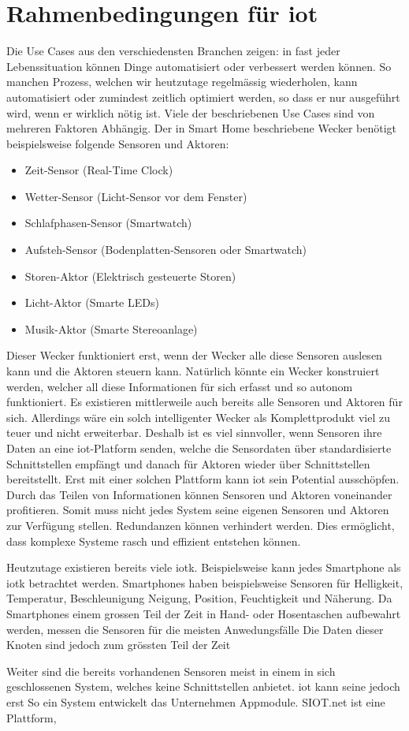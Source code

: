 \chapter{Rahmenbedingungen für \gls{iot}}
Die Use Cases aus den verschiedensten Branchen zeigen: in fast jeder Lebenssituation können Dinge automatisiert oder verbessert werden können. So manchen Prozess, welchen wir heutzutage regelmässig wiederholen, kann automatisiert oder zumindest zeitlich optimiert werden, so dass er nur ausgeführt wird, wenn er wirklich nötig ist. Viele der beschriebenen Use Cases sind von mehreren Faktoren Abhängig. Der in Smart Home beschriebene Wecker benötigt beispielsweise folgende Sensoren und Aktoren:
\begin{itemize}  
  \item Zeit-Sensor (Real-Time Clock)
  \item Wetter-Sensor (Licht-Sensor vor dem Fenster)
  \item Schlafphasen-Sensor (Smartwatch)
  \item Aufsteh-Sensor (Bodenplatten-Sensoren oder Smartwatch)
  \item Storen-Aktor (Elektrisch gesteuerte Storen)
  \item Licht-Aktor (Smarte LEDs)
  \item Musik-Aktor (Smarte Stereoanlage)
\end{itemize}
Dieser Wecker funktioniert erst, wenn der Wecker alle diese Sensoren auslesen kann und die Aktoren steuern kann. Natürlich könnte ein Wecker konstruiert werden, welcher all diese Informationen für sich erfasst und so autonom funktioniert. Es existieren mittlerweile auch bereits alle Sensoren und Aktoren für sich. Allerdings wäre ein solch intelligenter Wecker als Komplettprodukt viel zu teuer und nicht erweiterbar. Deshalb ist es viel sinnvoller, wenn Sensoren ihre Daten an eine \gls{iot}-Platform senden, welche die Sensordaten über standardisierte Schnittstellen empfängt und danach für Aktoren wieder über Schnittstellen bereitstellt. Erst mit einer solchen Plattform kann \gls{iot} sein Potential ausschöpfen. Durch das Teilen von Informationen können Sensoren und Aktoren voneinander profitieren.
Somit muss nicht jedes System seine eigenen Sensoren und Aktoren zur Verfügung stellen. Redundanzen können verhindert werden. Dies ermöglicht, dass komplexe Systeme rasch und effizient entstehen können.  

Heutzutage existieren bereits viele \gls{iotk}. Beispielsweise kann jedes Smartphone als \gls{iotk} betrachtet werden. Smartphones haben beispielsweise Sensoren für Helligkeit, Temperatur, Beschleunigung Neigung, Position, Feuchtigkeit und Näherung. Da Smartphones einem grossen Teil der Zeit in Hand- oder Hosentaschen aufbewahrt werden, messen die Sensoren für die meisten Anwedungsfälle 
Die Daten dieser Knoten sind jedoch zum grössten Teil der Zeit   

Weiter sind die bereits vorhandenen Sensoren meist in einem in sich geschlossenen System, welches keine Schnittstellen anbietet. \gls{iot} kann seine  jedoch erst 
So ein System entwickelt das Unternehmen Appmodule. SIOT.net ist eine Plattform, 